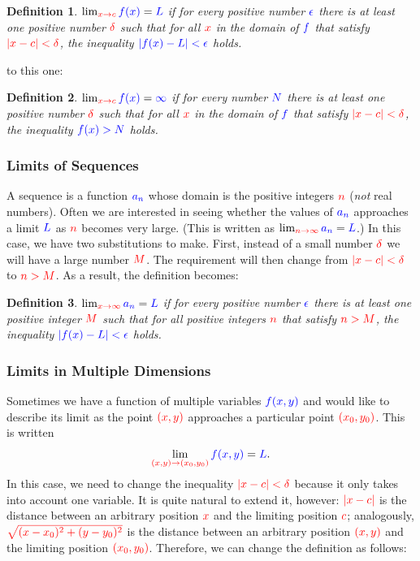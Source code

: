 \documentclass{myarticle}
\newcommand{\hor}[1]{\textcolor{red}{#1}} %
\newcommand{\ver}[1]{\textcolor{blue}{#1}}
\theoremstyle{nospace}
\newtheorem*{oldattempt}{Definition}
\newenvironment{attempt}{\begin{mdframed}\begin{oldattempt}}{\end{oldattempt}\end{mdframed}}
\newtheorem{old series theorem}{Theorem}
\newenvironment{series theorem}{\begin{mdframed}\begin{old series theorem}}{\end{old series theorem}\end{mdframed}}
\begin{document}
\begin{attempt} $\lim_{\hor{x \to c}} \ver{f(x)} = \ver{L}$ if for every positive number $\ver{\epsilon}$ there is at least one positive number $\hor{\delta}$ such that for all $\hor{x}$ in the domain of $\ver{f}$ that satisfy $\hor{|x - c| < \delta}$, the inequality $\ver{|f(x) - L| < \epsilon}$ holds. \end{attempt}

to this one:

\begin{attempt} $\lim_{\hor{x \to c}} \ver{f(x)} = \ver{\infty}$ if for every number $\ver{N}$ there is at least one positive number $\hor{\delta}$ such that for all $\hor{x}$ in the domain of $\ver{f}$ that satisfy $\hor{|x - c| < \delta}$, the inequality $\ver{f(x) > N}$ holds. \end{attempt}

\subsubsection{Limits of Sequences} \label{sec:limits of sequences}

A sequence is a function $\ver{a_n}$ whose domain is the positive integers $\hor{n}$ (\emph{not} real numbers). Often we are interested in seeing whether the values of $\ver{a_n}$ approaches a limit $\ver{L}$ as $\hor{n}$ becomes very large. (This is written as $\lim_{\hor{n \to \infty}} \ver{a_n} = \ver{L}$.) In this case, we have two substitutions to make. First, instead of a small number $\hor{\delta}$ we will have a large number $\hor{M}$. The requirement will then change from $\hor{|x - c| < \delta}$ to $\hor{n > M}$. As a result, the definition becomes:

\begin{attempt} $\lim_{\hor{x \to \infty}} \ver{a_n} = \ver{L}$ if for every positive number $\ver{\epsilon}$ there is at least one positive integer $\hor{M}$ such that for all positive integers $\hor{n}$ that satisfy $\hor{n > M}$, the inequality $\ver{|f(x) - L| < \epsilon}$ holds. \end{attempt}

\subsubsection{Limits in Multiple Dimensions} \label{sec:limits in multiple dimensions}

Sometimes we have a function of multiple variables $\ver{f(x, y)}$ and would like to describe its limit as the point $\hor{(x, y)}$ approaches a particular point $\hor{(x_0, y_0)}$. This is written \[ \lim_{\hor{(x, y) \to (x_0, y_0)}} \ver{f(x, y)} = \ver{L}. \] In this case, we need to change the inequality $\hor{|x - c| < \delta}$ because it only takes into account one variable. It is quite natural to extend it, however: $\hor{|x - c|}$ is the distance between an arbitrary position $\hor{x}$ and the limiting position $\hor{c}$; analogously, $\hor{\sqrt{(x - x_0)^2 + (y - y_0)^2}}$ is the distance between an arbitrary position $\hor{(x, y)}$ and the limiting position $\hor{(x_0, y_0)}$. Therefore, we can change the definition as follows:
\end{document}
